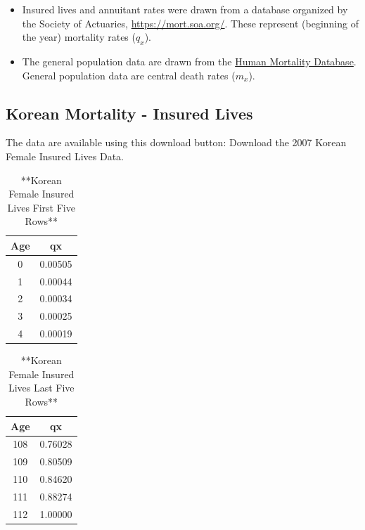 \documentclass[
]{book}
\providecommand{\tightlist}{%
  \setlength{\itemsep}{0pt}\setlength{\parskip}{0pt}}
\begin{document}
\begin{itemize}
\tightlist
\item
  Insured lives and annuitant rates were drawn from a database organized by the Society of Actuaries, \url{https://mort.soa.org/}. These represent (beginning of the year) mortality rates (\(q_x\)).
\item
  The general population data are drawn from the \href{http://www.mortality.org/}{Human Mortality Database}. General population data are central death rates (\(m_x\)).
\end{itemize}

\hypertarget{korean-mortality---insured-lives}{%
\subsection*{Korean Mortality - Insured Lives}\label{korean-mortality---insured-lives}}

The data are available using this download button:
Download the 2007 Korean Female Insured Lives Data.

\begin{table}

\caption{\label{tab:unnamed-chunk-25}**Korean Female Insured Lives First Five Rows**}
\centering
\begin{tabular}[t]{c|c}
\hline
Age & qx\\
\hline
0 & 0.00505\\
\hline
1 & 0.00044\\
\hline
2 & 0.00034\\
\hline
3 & 0.00025\\
\hline
4 & 0.00019\\
\hline
\end{tabular}
\end{table}

\begin{table}

\caption{\label{tab:unnamed-chunk-25}**Korean Female Insured Lives Last Five Rows**}
\centering
\begin{tabular}[t]{c|c}
\hline
Age & qx\\
\hline
108 & 0.76028\\
\hline
109 & 0.80509\\
\hline
110 & 0.84620\\
\hline
111 & 0.88274\\
\hline
112 & 1.00000\\
\hline
\end{tabular}
\end{table}
\end{document}
